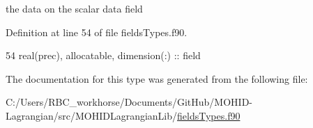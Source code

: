 the data on the scalar data field 



Definition at line 54 of file fields\+Types.\+f90.


\begin{DoxyCode}
54         \textcolor{keywordtype}{real(prec)}, \textcolor{keywordtype}{allocatable}, \textcolor{keywordtype}{dimension(:)} :: field
\end{DoxyCode}


The documentation for this type was generated from the following file\+:\begin{DoxyCompactItemize}
\item 
C\+:/\+Users/\+R\+B\+C\+\_\+workhorse/\+Documents/\+Git\+Hub/\+M\+O\+H\+I\+D-\/\+Lagrangian/src/\+M\+O\+H\+I\+D\+Lagrangian\+Lib/\mbox{\hyperlink{fields_types_8f90}{fields\+Types.\+f90}}\end{DoxyCompactItemize}
